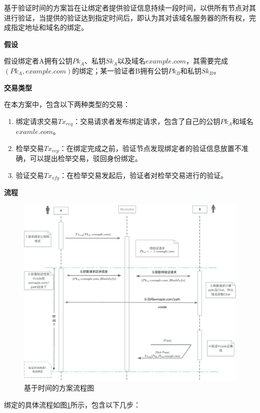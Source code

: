 基于验证时间的方案旨在让绑定者提供验证信息持续一段时间，以供所有节点对其进行验证，当提供的验证达到指定时间后，即认为其对该域名服务器的所有权，完成指定地址和域名的绑定。


\noindent\textbf{假设}

假设绑定者A拥有公钥$Pk_A$、私钥$Sk_A$以及域名$example.com$，其需要完成$(Pk_A, example.com)$的绑定；某一验证者B拥有公钥$Pk_B$和私钥$Sk_B$。

\noindent\textbf{交易类型}

在本方案中，包含以下两种类型的交易：

\begin{enumerate}
	\item 绑定请求交易$Tx_{req}$：交易请求者发布绑定请求，包含了自己的公钥$Pk_A$和域名$examle.com$。
	\item 检举交易$Tx_{rep}$：在绑定完成之前，验证节点发现绑定者的验证信息放置不准确，可以提出检举交易，驳回身份绑定。
	\item 验证交易$Tx_{vfy}$：在检举交易发起后，验证者对检举交易进行的验证。
\end{enumerate}

\noindent\textbf{流程}

\begin{figure}[!htbp]
 	\centering
 	\includegraphics[width = 1\textwidth]{img/time_based_workflow}
 	\caption{基于时间的方案流程图}\label{fig:time_based_workflow}
\end{figure}

绑定的具体流程如图\ref{fig:time_based_workflow}所示，包含以下几步：

